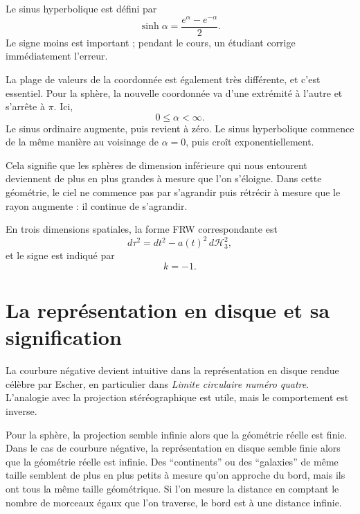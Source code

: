 Le sinus hyperbolique est défini par
\begin{equation}
\sinh\alpha=\frac{e^\alpha-e^{-\alpha}}{2}.
\end{equation}
Le signe moins est important ; pendant le cours, un étudiant corrige immédiatement l’erreur.

La plage de valeurs de la coordonnée est également très différente, et c’est essentiel. Pour la sphère, la nouvelle coordonnée va d’une extrémité à l’autre et s’arrête à \(\pi\). Ici,
\begin{equation}
0\leq \alpha<\infty.
\end{equation}
Le sinus ordinaire augmente, puis revient à zéro. Le sinus hyperbolique commence de la même manière au voisinage de \(\alpha=0\), puis croît exponentiellement.

Cela signifie que les sphères de dimension inférieure qui nous entourent deviennent de plus en plus grandes à mesure que l’on s’éloigne. Dans cette géométrie, le ciel ne commence pas par s’agrandir puis rétrécir à mesure que le rayon augmente : il continue de s’agrandir.

En trois dimensions spatiales, la forme FRW correspondante est
\begin{equation}
d\tau^2=dt^2-a(t)^2\,d\mathcal H_3^2,
\end{equation}
et le signe est indiqué par
\begin{equation}
k=-1.
\end{equation}

\section{La représentation en disque et sa signification}

La courbure négative devient intuitive dans la représentation en disque rendue célèbre par Escher, en particulier dans \emph{Limite circulaire numéro quatre}. L’analogie avec la projection stéréographique est utile, mais le comportement est inverse.

Pour la sphère, la projection semble infinie alors que la géométrie réelle est finie. Dans le cas de courbure négative, la représentation en disque semble finie alors que la géométrie réelle est infinie. Des ``continents'' ou des ``galaxies'' de même taille semblent de plus en plus petits à mesure qu’on approche du bord, mais ils ont tous la même taille géométrique. Si l’on mesure la distance en comptant le nombre de morceaux égaux que l’on traverse, le bord est à une distance infinie.

